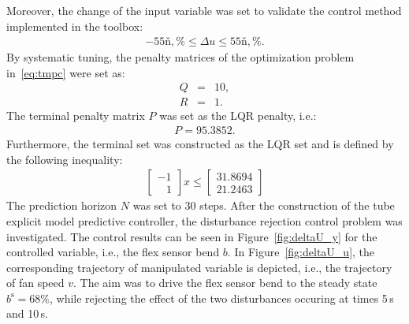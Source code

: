 \documentclass[letterpaper, 10 pt, conference]{ieeeconf}
\begin{document}
Moreover, the change of the input variable was set to validate the control method implemented in the toolbox:
\begin{eqnarray}
	\label{eq:const_du}
	-55ň,\% \le \Delta u \le 55ň,\%.
\end{eqnarray}
By systematic tuning, the penalty matrices of the optimization problem in~\eqref{eq:tmpc} were set as:
\begin{subequations}
	\label{eq:setup_penalty} 
	\begin{eqnarray}
		\label{eq:setup_Q}
		Q &=& 10, \\
		\label{eq:setup_R}
		R &=& 1.
	\end{eqnarray}
\end{subequations}
The terminal penalty matrix $P$ was set as the LQR penalty, i.e.:
\begin{eqnarray}
	\label{eq:setup_P}
	P = 95.3852.
\end{eqnarray}
Furthermore, the terminal set was constructed as the LQR set and is defined by the following inequality:
\begin{eqnarray}
	\label{eq:setup_terminal_set}
	\begin{bmatrix}
	-1 \\	
	\,\,\,\,\, 1
	\end{bmatrix} x \le 
	\begin{bmatrix}
		31.8694\\	
		21.2463
	\end{bmatrix}
\end{eqnarray}
The prediction horizon $N$ was set to 30 steps. After the construction of the tube explicit model predictive controller, the disturbance rejection control problem was investigated. The control results can be seen in Figure~\ref{fig:deltaU_y} for the controlled variable, i.e., the flex sensor bend $b$. In Figure~\ref{fig:deltaU_u}, the corresponding trajectory of manipulated variable is depicted, i.e., the trajectory of fan speed $v$. The aim was to drive the flex sensor bend to the steady state $ b^\mathrm{s} = 68\%$, while rejecting the effect of the two disturbances occuring at times 5\,s and 10\,s. 
\end{document}
